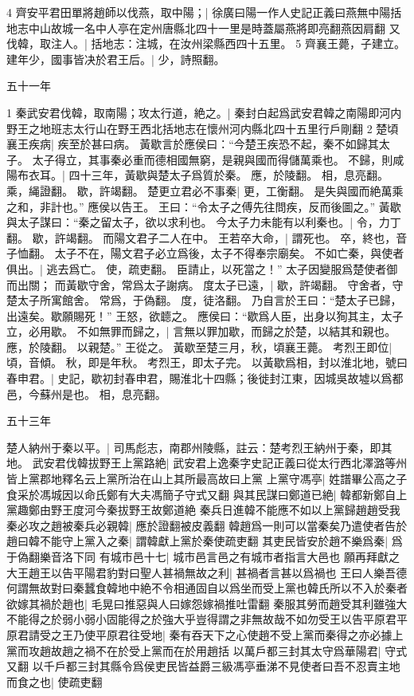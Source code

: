 4 齊安平君田單將趙師以伐燕，取中陽；|{
	徐廣曰陽一作人史記正義曰燕無中陽括地志中山故城一名中人亭在定州唐縣北四十一里是時蓋屬燕將即亮翻燕因肩翻}
又伐韓，取注人。|{
	括地志：注城，在汝州梁縣西四十五里。
	}
5 齊襄王薨，子建立。
建年少，國事皆决於君王后。|{
	少，詩照翻。
	}


五十一年


1 秦武安君伐韓，取南陽；攻太行道，絶之。|{
	秦封白起爲武安君韓之南陽即河内野王之地班志太行山在野王西北括地志在懷州河内縣北四十五里行戶剛翻}
2 楚頃襄王疾病|{
	疾至於甚曰病。
	}
黃歇言於應侯曰：“今楚王疾恐不起，秦不如歸其太子。
	太子得立，其事秦必重而德相國無窮，是親與國而得儲萬乘也。
	不歸，則咸陽布衣耳。|{
	四十三年，黃歇與楚太子爲質於秦。
	應，於陵翻。
	相，息亮翻。
	乘，䋲證翻。
	歇，許竭翻。
	}
楚更立君必不事秦|{
	更，工衡翻。
	}
是失與國而絶萬乘之和，非計也。”
應侯以告王。
王曰：“令太子之傅先往問疾，反而後圖之。”
黃歇與太子謀曰：“秦之留太子，欲以求利也。
今太子力未能有以利秦也。|{
	令，力丁翻。
	歇，許竭翻。
	}
而陽文君子二人在中。
王若卒大命，|{
	謂死也。
	卒，終也，音子恤翻。
	}
太子不在，陽文君子必立爲後，太子不得奉宗廟矣。
不如亡秦，與使者俱出。|{
	逃去爲亡。
	使，疏吏翻。
	}
臣請止，以死當之！”
太子因變服爲楚使者御而出關；
而黃歇守舍，常爲太子謝病。
度太子已遠，|{
	歇，許竭翻。
	守舍者，守楚太子所寓館舍。
	常爲，于偽翻。
	度，徒洛翻。
	}
乃自言於王曰：“楚太子已歸，出遠矣。歇願賜死！”
王怒，欲聼之。
應侯曰：“歇爲人臣，出身以狥其主，太子立，必用歇。
不如無罪而歸之，|{
	言無以罪加歇，而歸之於楚，以結其和親也。
	應，於陵翻。
	}
以親楚。”
王從之。
黃歇至楚三月，秋，頃襄王薨。
考烈王即位|{
	頃，音傾。
	秋，即是年秋。
	考烈王，即太子完。
	}
以黃歇爲相，封以淮北地，號曰春申君。|{
	史記，歇初封春申君，賜淮北十四縣；後徙封江東，因城吳故墟以爲都邑，今蘇州是也。
	相，息亮翻。
	}


五十三年

楚人納州于秦以平。|{
	司馬彪志，南郡州陵縣，註云：楚考烈王納州于秦，即其地。
	}
武安君伐韓拔野王上黨路絶|{
	武安君上逸秦字史記正義曰從太行西北澤潞等州皆上黨郡地釋名云上黨所治在山上其所最高故曰上黨}
上黨守馮亭|{
	姓譜畢公高之子食采於馮城因以命氏鄭有大夫馮簡子守式又翻}
與其民謀曰鄭道已絶|{
	韓都新鄭自上黨趣鄭由野王度河今秦拔野王故鄭道絶}
秦兵日進韓不能應不如以上黨歸趙趙受我秦必攻之趙被秦兵必親韓|{
	應於證翻被皮義翻}
韓趙爲一則可以當秦矣乃遣使者告於趙曰韓不能守上黨入之秦|{
	謂韓獻上黨於秦使疏吏翻}
其吏民皆安於趙不樂爲秦|{
	爲于偽翻樂音洛下同}
有城市邑十七|{
	城市邑言邑之有城市者指言大邑也}
願再拜獻之大王趙王以告平陽君豹對曰聖人甚禍無故之利|{
	甚禍者言甚以爲禍也}
王曰人樂吾德何謂無故對曰秦蠶食韓地中絶不令相通固自以爲坐而受上黨也韓氏所以不入於秦者欲嫁其禍於趙也|{
	毛晃曰推惡與人曰嫁怨嫁禍推吐雷翻}
秦服其勞而趙受其利雖強大不能得之於弱小弱小固能得之於強大乎豈得謂之非無故哉不如勿受王以告平原君平原君請受之王乃使平原君往受地|{
	秦有吞天下之心使趙不受上黨而秦得之亦必據上黨而攻趙故趙之禍不在於受上黨而在於用趙括}
以萬戶都三封其太守爲華陽君|{
	守式又翻}
以千戶都三封其縣令爲侯吏民皆益爵三級馮亭垂涕不見使者曰吾不忍賣主地而食之也|{
	使疏吏翻}


